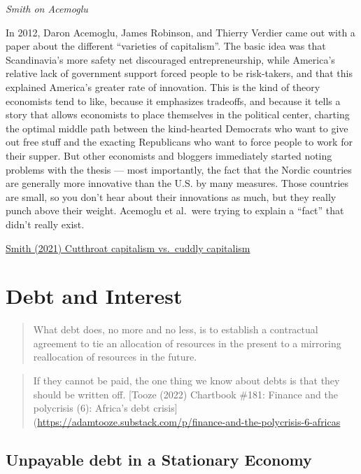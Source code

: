 \documentclass[
]{book}
\begin{document}
\emph{Smith on Acemoglu}

In 2012, Daron Acemoglu, James Robinson, and Thierry Verdier came out with a paper about the different ``varieties of capitalism''. The basic idea was that Scandinavia's more safety net discouraged entrepreneurship, while America's relative lack of government support forced people to be risk-takers, and that this explained America's greater rate of innovation. This is the kind of theory economists tend to like, because it emphasizes tradeoffs, and because it tells a story that allows economists to place themselves in the political center, charting the optimal middle path between the kind-hearted Democrats who want to give out free stuff and the exacting Republicans who want to force people to work for their supper. But other economists and bloggers immediately started noting problems with the thesis --- most importantly, the fact that the Nordic countries are generally more innovative than the U.S. by many measures. Those countries are small, so you don't hear about their innovations as much, but they really punch above their weight. Acemoglu et al.~were trying to explain a ``fact'' that didn't really exist.

\href{https://noahpinion.substack.com/p/cutthroat-capitalism-vs-cuddly-capitalism}{Smith (2021) Cutthroat capitalism vs.~cuddly capitalism}

\hypertarget{debt-and-interest}{%
\chapter{Debt and Interest}\label{debt-and-interest}}

\begin{quote}
What debt does, no more and no less, is to establish a contractual agreement to tie an allocation of resources in the present to a mirroring reallocation of resources in the future.
\end{quote}

\begin{quote}
If they cannot be paid, the one thing we know about debts is that they should be written off.
{[}Tooze (2022) Chartbook \#181: Finance and the polycrisis (6): Africa's debt crisis{]}(\url{https://adamtooze.substack.com/p/finance-and-the-polycrisis-6-africas}
\end{quote}

\hypertarget{unpayable-debt-in-a-stationary-economy}{%
\section{Unpayable debt in a Stationary Economy}\label{unpayable-debt-in-a-stationary-economy}}
\end{document}
